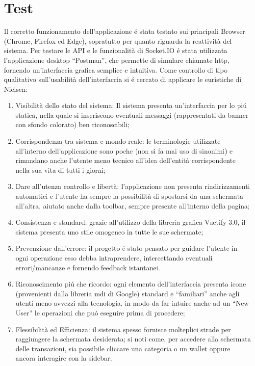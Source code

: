 \documentclass{report}
\begin{document}
\section{Test}
Il corretto funzionamento dell’applicazione é stata testato sui principali Browser (Chrome, Firefox ed Edge), sopratutto per quanto riguarda la reattività del sistema.
\newline \newline
Per testare le API e le funzionalità di Socket.IO é stata utilizzata l’applicazione desktop “Postman”, che permette di simulare chiamate http, fornendo un’interfaccia grafica semplice e intuitiva.
\newline \newline
Come controllo di tipo qualitativo sull’usabilità dell’interfaccia si é cercato di applicare le euristiche di Nielsen:
\begin{enumerate}
    \item Visibilità dello stato del sistema: Il sistema presenta un’interfaccia per lo piú statica, nella quale si inseriscono eventuali messaggi (rappresentati da banner con sfondo colorato) ben riconoscibili;
    \item Corrispondenza tra sistema e mondo reale: le terminologie utilizzate all’interno dell’applicazione sono poche (non si fa mai uso di sinonimi) e rimandano anche l’utente meno tecnico all’idea dell’entità corrispondente nella sua vita di tutti i giorni;
    \item Dare all’utenza controllo e libertà: l’applicazione non presenta rindirizzamenti automatici e l’utente ha sempre la possibilità di spostarsi da una schermata all’altra, aiutato anche dalla toolbar, sempre presente all’interno della pagina;
    \item Consistenza e standard: grazie all’utilizzo della libreria grafica Vuetify 3.0, il sistema presenta uno stile omogeneo in tutte le sue schermate;
    \item Prevenzione dall’errore: il progetto é stato pensato per guidare l’utente in ogni operazione esso debba intraprendere, intercettando eventuali errori/mancanze e fornendo feedback istantanei.
    \item Riconoscimento piú che ricordo: ogni elemento dell’interfaccia presenta icone (provenienti dalla libreria mdi di Google) standard e “familiari” anche agli utenti meno avvezzi alla tecnologia, in modo da far intuire anche ad un “New User” le operazioni che puó eseguire prima di procedere;
    \item Flessibilità ed Efficienza: il sistema spesso fornisce molteplici strade per raggiungere la schermata desiderata; si noti come, per accedere alla schermata delle transazioni, sia possibile cliccare una categoria o un wallet oppure ancora interagire con la sidebar;

\end{enumerate}
\end{document}
